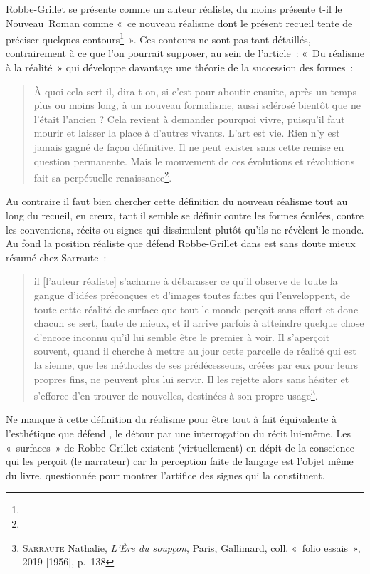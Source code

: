 \documentclass[12pt, a4paper]{article}
\begin{document}
Robbe-Grillet se présente comme un auteur réaliste, du moins présente t-il le Nouveau~Roman comme «~ce nouveau réalisme dont le présent recueil tente de préciser quelques contours\footnote{}~». Ces contours ne sont pas tant détaillés, contrairement à ce que l'on pourrait supposer, au sein de l'article~: «~Du réalisme à la réalité~» qui développe davantage une théorie de la succession des formes~:
\begin{quote}
    À quoi cela sert-il, dira-t-on, si c’est pour aboutir ensuite, après un temps plus ou moins long, à un nouveau formalisme, aussi sclérosé bientôt que ne l’était l’ancien ? Cela revient à demander pourquoi vivre, puisqu’il faut mourir et laisser la place à d’autres vivants. L’art est vie. Rien n’y est jamais gagné de façon définitive. Il ne peut exister sans cette remise en question permanente. Mais le mouvement de ces évolutions et révolutions fait sa perpétuelle renaissance\footnote{}.
\end{quote}
Au contraire il faut bien chercher cette définition du nouveau réalisme tout au long du recueil, en creux, tant il semble se définir contre les formes éculées, contre les conventions, récits ou signes qui dissimulent plutôt qu'ils ne révèlent le monde. Au fond la position réaliste que défend Robbe-Grillet dans \punr{} est sans doute mieux résumé chez Sarraute~: 
\begin{quote}
    il [l'auteur réaliste] s'acharne à débarasser ce qu'il observe de toute la gangue d'idées préconçues et d'images toutes faites qui l'enveloppent, de toute cette réalité de surface que tout le monde perçoit sans effort et donc chacun se sert, faute de mieux, et il arrive parfois à atteindre quelque chose d'encore inconnu qu'il lui semble être le premier à voir. Il s'aperçoit souvent, quand il cherche à mettre au jour cette parcelle de réalité qui est la sienne, que les méthodes de ses prédécesseurs, créées par eux pour leurs propres fins, ne peuvent plus lui servir. Il les rejette alors sans hésiter et s'efforce d'en trouver de nouvelles, destinées à son propre usage\footnote{\textsc{Sarraute} Nathalie, \textit{L'Ère du soupçon}, Paris, Gallimard, coll. «~folio essais~», 2019 [1956], p.~138}.
\end{quote}
Ne manque à cette définition du réalisme pour être tout à fait équivalente à l'esthétique que défend \punr, le détour par une interrogation du récit lui-même. Les «~surfaces~» de Robbe-Grillet existent (virtuellement) en dépit de la conscience qui les perçoit (le narrateur) car la perception faite de langage est l'objet même du livre, questionnée pour montrer l'artifice des signes qui la constituent.
\end{document}
